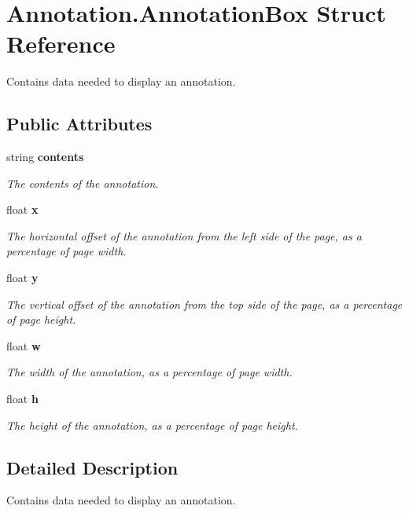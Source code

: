 \section{Annotation.\+Annotation\+Box Struct Reference}
\label{struct_annotation_1_1_annotation_box}


Contains data needed to display an annotation.  


\subsection*{Public Attributes}
\begin{DoxyCompactItemize}
\item 
string {\bf contents}
\begin{DoxyCompactList}\small\item\em The contents of the annotation. \end{DoxyCompactList}\item 
float {\bf x}
\begin{DoxyCompactList}\small\item\em The horizontal offset of the annotation from the left side of the page, as a percentage of page width. \end{DoxyCompactList}\item 
float {\bf y}
\begin{DoxyCompactList}\small\item\em The vertical offset of the annotation from the top side of the page, as a percentage of page height. \end{DoxyCompactList}\item 
float {\bf w}
\begin{DoxyCompactList}\small\item\em The width of the annotation, as a percentage of page width. \end{DoxyCompactList}\item 
float {\bf h}
\begin{DoxyCompactList}\small\item\em The height of the annotation, as a percentage of page height. \end{DoxyCompactList}\end{DoxyCompactItemize}


\subsection{Detailed Description}
Contains data needed to display an annotation. 



